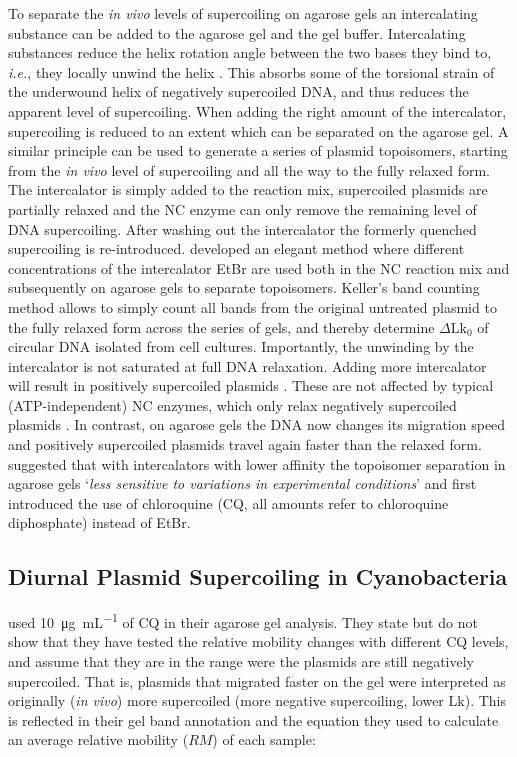 \documentclass[10pt,a4]{article}
\def\cite#1{\hypersetup{citecolor=Teal}\citep{#1}} %
\newcommand{\ugml}{\micro\gram\per\milli\liter}
\newcommand{\lk}{\ensuremath{\text{Lk}}}
\newcommand{\dlkr}{\ensuremath{\Delta\text{Lk}_0}}
\newcommand{\ie}{\textit{i.e.}}
\begin{document}
To separate the \textit{in vivo} levels of supercoiling on agarose
gels an intercalating substance can be added to the agarose gel and
the gel buffer.  Intercalating substances reduce the helix rotation
angle between the two bases they bind to, \ie{}, they locally unwind
the helix \cite{Lerman1961, Pritchard1966}. This absorbs some of the
torsional strain of the underwound helix of negatively supercoiled
DNA, and thus reduces the apparent level of supercoiling.  When adding
the right amount of the intercalator, supercoiling is reduced to an
extent which can be separated on the agarose gel.  A similar principle
can be used to generate a series of plasmid topoisomers, starting from
the \textit{in vivo} level of supercoiling and all the way to the
fully relaxed form. The intercalator is simply added to the reaction
mix, supercoiled plasmids are partially relaxed and the NC enzyme can
only remove the remaining level of DNA supercoiling.  After washing
out the intercalator the formerly quenched supercoiling is
re-introduced.  \citet{Keller1975b} developed an elegant method where
different concentrations of the intercalator EtBr are used both in the
NC reaction mix and subsequently on agarose gels to separate
topoisomers. Keller's band counting method allows to simply count all
bands from the original untreated plasmid to the fully relaxed form
across the series of gels, and thereby determine \dlkr{} of circular
DNA isolated from cell cultures.
%
Importantly, the unwinding by the intercalator is not saturated at full
DNA relaxation. Adding more intercalator will result in positively
supercoiled plasmids \cite{Shure1977, Bowater1992}. These are not
affected by typical (ATP-independent) NC enzymes, which only relax
negatively supercoiled plasmids \cite{Wang1971, Kirkegaard1985}. In
contrast, on agarose gels the DNA now changes its migration speed and
positively supercoiled plasmids travel again faster than the relaxed
form. \citet{Shure1977} suggested that with intercalators with lower
affinity the topoisomer separation in agarose gels `\textit{less
  sensitive to variations in experimental conditions}' and first
introduced the use of chloroquine (CQ, all amounts refer to
chloroquine diphosphate) instead of EtBr.

\subsection{Diurnal Plasmid Supercoiling in Cyanobacteria}

\citet{Woelfle2007} used \SI{10}{\ugml} of CQ in their
agarose gel analysis. They state but do not show that they have tested
the relative mobility changes with different CQ levels, and assume
that they are in the range were the plasmids are still negatively
supercoiled.  That is, plasmids that migrated faster on the gel were
interpreted as originally (\textit{in vivo}) more supercoiled (more
negative supercoiling, lower $\lk$). This is reflected in their
gel band annotation and the equation they used to calculate an average
relative mobility ($RM$) of each sample:
\end{document}
